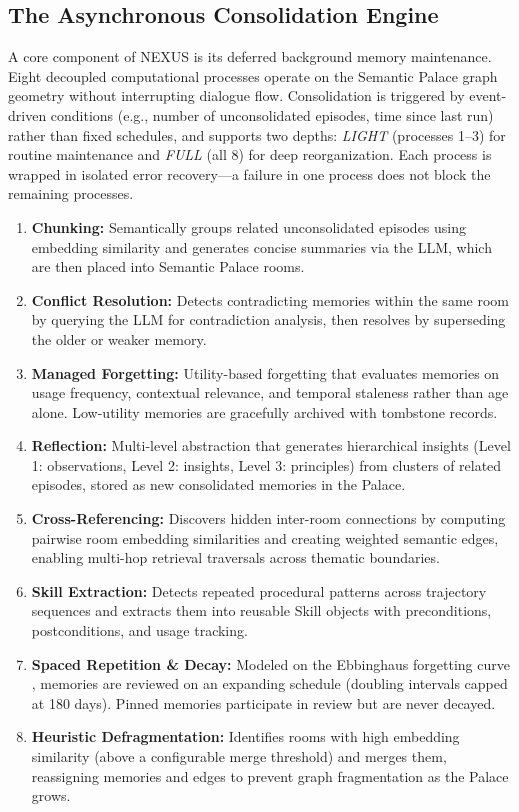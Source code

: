 \documentclass[conference]{IEEEtran}
\begin{document}
\subsection{The Asynchronous Consolidation Engine}
A core component of NEXUS is its deferred background memory maintenance. Eight decoupled computational processes operate on the Semantic Palace graph geometry without interrupting dialogue flow. Consolidation is triggered by event-driven conditions (e.g., number of unconsolidated episodes, time since last run) rather than fixed schedules, and supports two depths: \textit{LIGHT} (processes 1--3) for routine maintenance and \textit{FULL} (all 8) for deep reorganization. Each process is wrapped in isolated error recovery---a failure in one process does not block the remaining processes.
\begin{enumerate}
    \item \textbf{Chunking:} Semantically groups related unconsolidated episodes using embedding similarity and generates concise summaries via the LLM, which are then placed into Semantic Palace rooms.
    \item \textbf{Conflict Resolution:} Detects contradicting memories within the same room by querying the LLM for contradiction analysis, then resolves by superseding the older or weaker memory.
    \item \textbf{Managed Forgetting:} Utility-based forgetting that evaluates memories on usage frequency, contextual relevance, and temporal staleness rather than age alone. Low-utility memories are gracefully archived with tombstone records.
    \item \textbf{Reflection:} Multi-level abstraction that generates hierarchical insights (Level 1: observations, Level 2: insights, Level 3: principles) from clusters of related episodes, stored as new consolidated memories in the Palace.
    \item \textbf{Cross-Referencing:} Discovers hidden inter-room connections by computing pairwise room embedding similarities and creating weighted semantic edges, enabling multi-hop retrieval traversals across thematic boundaries.
    \item \textbf{Skill Extraction:} Detects repeated procedural patterns across trajectory sequences and extracts them into reusable Skill objects with preconditions, postconditions, and usage tracking.
    \item \textbf{Spaced Repetition \& Decay:} Modeled on the Ebbinghaus forgetting curve \cite{ebbinghaus1913memory}, memories are reviewed on an expanding schedule (doubling intervals capped at 180 days). Pinned memories participate in review but are never decayed.
    \item \textbf{Heuristic Defragmentation:} Identifies rooms with high embedding similarity (above a configurable merge threshold) and merges them, reassigning memories and edges to prevent graph fragmentation as the Palace grows.
\end{enumerate}
\end{document}
